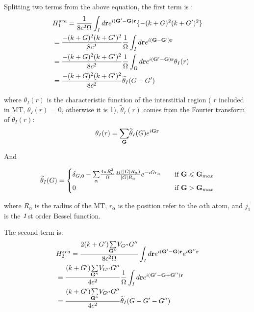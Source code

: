 \documentclass[a4paper]{report}
\begin{document}
\noindent Splitting two terms from the above equation, the first term is :
\begin{equation}\label{sra1}
\begin{split}
&  H_{1}^{sra} = \frac{1}{8 {c}^2 \Omega} \int_{I} d \textbf {r} \expg<(G'-G)> \{-(k+G)^2(k+G')^2\}  \\
&  = \frac{-(k+G)^2(k+G')^2}{8 {c}^2 } \frac{1}{\Omega} \int_{I} d \textbf {r} \expg<(G-G')>   \\
&  = \frac{-(k+G)^2(k+G')^2}{8 {c}^2 } \frac{1}{\Omega} \int_{\Omega} d  \textbf {r} \expg<(G'-G)> \theta_{I}(r)  \\
&  = \frac{-(k+G)^2(k+G')^2}{8 {c}^2 } \widetilde{\theta}_{I}(G-G')  \\
\end{split}
\end{equation}

\noindent where $\theta_{I}(r)$ is the characteristic function of the interstitial region ( $r$ included in MT, $\theta_{I}(r)$ = 0, otherwise it is 1), $\widetilde{\theta}_{I}(r)$ comes from the Fourier transform of $\theta_{I}(r)$:
\begin{equation}
\theta_{I}(r) = \sumg<G> \widetilde{\theta}_{I}(G) \expg<G>
\end{equation}

\noindent And
 
\begin{equation*}\label{ap1}
\widetilde{\theta}_{I}(G) =
\begin{cases}  \delta_{G,0}-\sumg<\alpha> \frac{4 \pi R_{\alpha}^{3}}{\Omega} \frac{j_1(|G|R_{\alpha})}{|G|R_{\alpha}} e^{-iGr_{\alpha}} & \quad \mbox{if $\textbf{G} \leqslant \textbf{G}_{max} $}
\\
0  & \quad \mbox{if $\textbf{G} > \textbf{G}_{max} $}\\ 
\end{cases}
\end{equation*}

\noindent where $R_{\alpha}$ is the radius of the MT, $r_{\alpha}$ is the position refer to the $\alpha$th atom, and $j_1$ is the $\it1$st order Bessel function.

T\noindent he second term is:
\begin{equation}\label{sra2}
\begin{split}
& H_{2}^{sra} = \frac{2(k+G') \sumg<G''> V_{G''}G''}{8 {c}^2 \Omega} \int_{I} d \textbf {r} \expg<(G'-G)>  \expg<G''>  \\
& =  \frac{(k+G') \sumg<G''> V_{G''}G''}{4 {c}^2 } \frac{1}{\Omega} \int_{I} d \textbf {r} \expg<(G'-G+G'')>  \\
& =  \frac{(k+G') \sumg<G''> V_{G''}G''}{4 {c}^2 } \widetilde{\theta}_{I}(G-G'-G'')
\end{split}
\end{equation}
\end{document}
